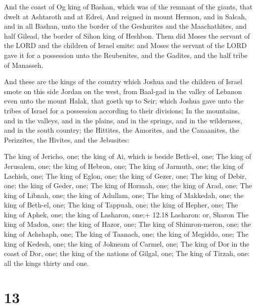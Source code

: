  And the coast of Og king of Bashan, which was of the
remnant of the giants, that dwelt at Ashtaroth and at Edrei,
 And reigned in mount Hermon, and in Salcah, and in all
Bashan, unto the border of the Geshurites and the Maachathites, and half
Gilead, the border of Sihon king of Heshbon.  Them did Moses
the servant of the LORD and the children of Israel smite: and Moses the
servant of the LORD gave it for a possession unto the Reubenites, and
the Gadites, and the half tribe of Manasseh.

 And these are the kings of the country which Joshua and
the children of Israel smote on this side Jordan on the west, from
Baal-gad in the valley of Lebanon even unto the mount Halak, that goeth
up to Seir; which Joshua gave unto the tribes of Israel for a possession
according to their divisions;  In the mountains, and in the
valleys, and in the plains, and in the springs, and in the wilderness,
and in the south country; the Hittites, the Amorites, and the
Canaanites, the Perizzites, the Hivites, and the Jebusites:

 The king of Jericho, one; the king of Ai, which is beside
Beth-el, one;  The king of Jerusalem, one; the king of
Hebron, one;  The king of Jarmuth, one; the king of
Lachish, one;  The king of Eglon, one; the king of Gezer,
one;  The king of Debir, one; the king of Geder, one;
 The king of Hormah, one; the king of Arad, one;
 The king of Libnah, one; the king of Adullam, one;
 The king of Makkedah, one; the king of Beth-el, one;
 The king of Tappuah, one; the king of Hepher, one;
 The king of Aphek, one; the king of Lasharon, one;+ 12.18
Lasharon: or, Sharon  The king of Madon, one; the king of
Hazor, one;  The king of Shimron-meron, one; the king of
Achshaph, one;  The king of Taanach, one; the king of
Megiddo, one;  The king of Kedesh, one; the king of Jokneam
of Carmel, one;  The king of Dor in the coast of Dor, one;
the king of the nations of Gilgal, one;  The king of
Tirzah, one: all the kings thirty and one.

\hypertarget{section-12}{%
\section{13}\label{section-12}}

